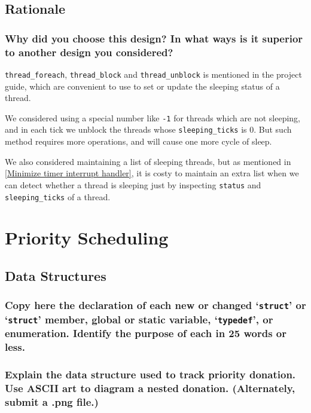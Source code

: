 \documentclass[sigconf, nonacm]{acmart}
\begin{document}
        \subsection{Rationale}
            
            \subsubsection{Why did you choose this design? In what ways is it superior to another design you considered? }
                \texttt{thread\_foreach}, \texttt{thread\_block} and \texttt{thread\_unblock} is mentioned in the project guide, which are convenient to use to set or update the sleeping status of a thread.

                We considered using a special number like \texttt{-1} for threads which are not sleeping, and in each tick we unblock the threads whose \texttt{sleeping\_ticks} is 0. But such method requires more operations, and will cause one more cycle of sleep. 

                We also considered maintaining a list of sleeping threads, but as mentioned in \ref{Minimize timer interrupt handler}, it is costy to maintain an extra list when we can detect whether a thread is sleeping just by inspecting \texttt{status} and \texttt{sleeping\_ticks} of a thread. 
    
    \section{Priority Scheduling}

        \label{Priority Scheduling}

        \subsection{Data Structures}
            
            \subsubsection{Copy here the declaration of each new or changed `\texttt{struct}' or `\texttt{struct}' member, global or static variable, `\texttt{typedef}', or enumeration. Identify the purpose of each in 25 words or less. } 

            \subsubsection{Explain the data structure used to track priority donation. Use ASCII art to diagram a nested donation.  (Alternately, submit a .png file.)}
\end{document}
